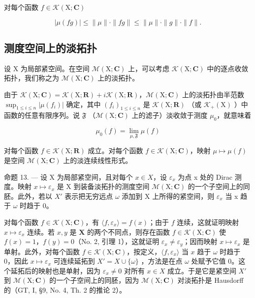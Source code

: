 对每个函数 \(f\in \mathcal{K}(\mathrm{X};\mathbf{C})\)

\[
| \mu (f g) | \leqslant \| \mu \| \cdot \| f g \| \leqslant \| \mu \| \cdot \| g \| \cdot \| f \|.
\]

\subsection{测度空间上的淡拓扑}

设 X 为局部紧空间。在空间 \(\mathcal{M}(\mathrm{X};\mathbf{C})\) 上，可以考虑 \(\mathcal{K}(\mathrm{X};\mathbf{C})\) 中的逐点收敛拓扑，我们称之为 \(\mathcal{M}(\mathrm{X};\mathbf{C})\) 上的淡拓扑。

由于 \(\mathcal{K}(\mathrm{X};\mathbf{C}) = \mathcal{K}(\mathrm{X};\mathbf{R}) + i\mathcal{K}(\mathrm{X};\mathbf{R})\)，\(\mathcal{M}(\mathrm{X};\mathbf{C})\) 上的淡拓扑由半范数 \(\sup_{1\leqslant i\leqslant n}|\mu (f_i)|\) 确定，其中 \((f_i)_{1\leqslant i\leqslant n}\) 是 \(\mathcal{K}(\mathrm{X};\mathbf{R})\) （或 \(\mathcal{K}_{+}(\mathrm{X})\) ）中函数的任意有限序列。说 \(\mathfrak{F}\) （\(\mathcal{M}(\mathrm{X};\mathbf{C})\) 上的滤子）淡收敛于测度 \(\mu_0\)，就意味着

\[
\mu_ {0} (f) = \lim _ {\mu , \mathfrak {F}} \mu (f)
\]

对每个函数 \(f \in \mathcal{K}(\mathrm{X};\mathbf{R})\) 成立。对每个函数 \(f \in \mathcal{K}(\mathrm{X};\mathbf{C})\)，映射 \(\mu \mapsto \mu(f)\) 是空间 \(\mathcal{M}(\mathrm{X};\mathbf{C})\) 上的淡连续线性形式。

命题 13. --- 设 X 为局部紧空间，且对每个 \(x \in X\)，设 \(\varepsilon_{x}\) 为点 x 处的 Dirac 测度。映射 \(x \mapsto \varepsilon_{x}\) 是 X 到装备淡拓扑的测度空间 \(\mathcal{M}(\mathrm{X};\mathbf{C})\) 的一个子空间上的同胚。此外，若以 \(X'\) 表示把无穷远点 \(\omega\) 添加到 X 上所得的紧空间，则 \(\varepsilon_{x}\) 当 x 趋于 \(\omega\) 时趋于 0。

对每个函数 \(f \in \mathcal{K}(\mathrm{X};\mathbf{C})\)，有 \(\langle f,\varepsilon_x\rangle = f(x)\)；由于 \(f\) 连续，这就证明映射 \(x \mapsto \varepsilon_x\) 连续。若 \(x,y\) 是 \(\mathbf{X}\) 的两个不同点，则存在函数 \(f \in \mathcal{K}(\mathrm{X};\mathbf{C})\) 使 \(f(x) = 1\)，\(f(y) = 0\)（No. 2, 引理 1），这就证明 \(\varepsilon_x \neq \varepsilon_y\)；因而映射 \(x \mapsto \varepsilon_x\) 是单射。此外，对每个函数 \(f \in \mathcal{K}(\mathrm{X};\mathbf{C})\)，按定义，\(\langle f,\varepsilon_x\rangle\) 当 \(x\) 趋于 \(\omega\) 时趋于 0，因此 \(x \mapsto \varepsilon_x\) 可连续延拓到 \(X' = X \cup \{\omega\}\) ，方法是在点 \(\omega\) 处赋予它值 0。这个延拓后的映射也是单射，因为 \(\varepsilon_x \neq 0\) 对所有 \(x \in X\) 成立。于是它是紧空间 \(X'\) 到 \(\mathcal{M}(\mathrm{X};\mathbf{C})\) 的一个子空间上的同胚，因为 \(\mathcal{M}(\mathrm{X};\mathbf{C})\) 对淡拓扑是 Hausdorff 的（GT, I, §9, No. 4, Th. 2 的推论 2）。

